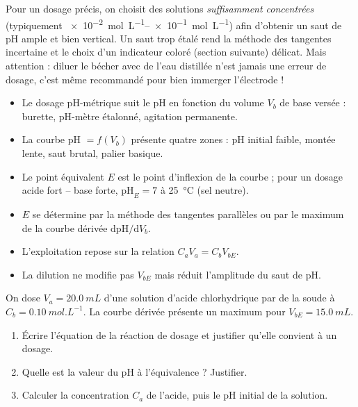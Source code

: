 \documentclass[11pt]{article}
\begin{document}
\begin{attention}
Pour un dosage précis, on choisit des solutions \emph{suffisamment concentrées} (typiquement \SIrange{e-2}{e-1}{mol.L^{-1}}) afin d'obtenir un saut de pH ample et bien vertical. Un saut trop étalé rend la méthode des tangentes incertaine et le choix d'un indicateur coloré (section suivante) délicat. Mais attention : diluer le bécher avec de l'eau distillée n'est jamais une erreur de dosage, c'est même recommandé pour bien immerger l'électrode !
\end{attention}

\begin{aretenir}
\begin{itemize}
\item Le dosage pH-métrique suit le pH en fonction du volume $V_b$ de base versée : burette, pH-mètre étalonné, agitation permanente.
\item La courbe pH $= f(V_b)$ présente quatre zones : pH initial faible, montée lente, saut brutal, palier basique.
\item Le point équivalent $E$ est le point d'inflexion de la courbe ; pour un dosage acide fort -- base forte, $\mathrm{pH}_E = 7$ à \SI{25}{\celsius} (sel neutre).
\item $E$ se détermine par la méthode des tangentes parallèles ou par le maximum de la courbe dérivée $\mathrm{d}\mathrm{pH}/\mathrm{d}V_b$.
\item L'exploitation repose sur la relation $C_a V_a = C_b V_{bE}$.
\item La dilution ne modifie pas $V_{bE}$ mais réduit l'amplitude du saut de pH.
\end{itemize}
\end{aretenir}

\begin{exercice}
On dose $V_a = \SI{20,0}{mL}$ d'une solution d'acide chlorhydrique par de la soude à $C_b = \SI{0,10}{mol.L^{-1}}$. La courbe dérivée présente un maximum pour $V_{bE} = \SI{15,0}{mL}$.
\begin{enumerate}
\item Écrire l'équation de la réaction de dosage et justifier qu'elle convient à un dosage.
\item Quelle est la valeur du pH à l'équivalence ? Justifier.
\item Calculer la concentration $C_a$ de l'acide, puis le pH initial de la solution.
\end{enumerate}
\end{exercice}
\end{document}
